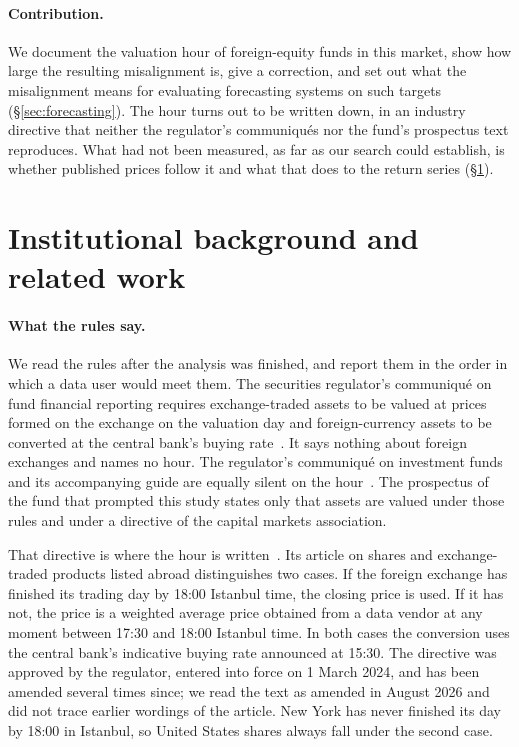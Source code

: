 \documentclass[11pt,a4paper]{article}
\begin{document}
\paragraph{Contribution.} We document the valuation hour of foreign-equity
funds in this market, show how large the resulting misalignment is, give a
correction, and set out what the misalignment means for evaluating
forecasting systems on such targets (\S\ref{sec:forecasting}). The hour turns out to be written down, in an industry directive
that neither the regulator's communiqu\'es nor the fund's prospectus text
reproduces. What had not been measured, as far as our search could establish,
is whether published prices follow it and what that does to the return series
(\S\ref{sec:related}).

\section{Institutional background and related work}\label{sec:related}

\paragraph{What the rules say.} We read the rules after the analysis was
finished, and report them in the order in which a data user would meet them.
The securities regulator's communiqu\'e on fund financial reporting requires
exchange-traded assets to be valued at prices formed on the exchange on the
valuation day and foreign-currency assets to be converted at the central
bank's buying rate~\cite{spk2013valuation}. It says nothing about foreign
exchanges and names no hour. The regulator's communiqu\'e on investment funds
and its accompanying guide are equally silent on the
hour~\cite{spk2013funds}. The prospectus of the fund that prompted this study
states only that assets are valued under those rules and under a directive of
the capital markets association.

That directive is where the hour is written~\cite{tspb2026valuation}. Its
article on shares and exchange-traded products listed abroad distinguishes two
cases. If the foreign exchange has finished its trading day by 18:00 Istanbul
time, the closing price is used. If it has not, the price is a weighted
average price obtained from a data vendor at any moment between 17:30 and
18:00 Istanbul time. In both cases the conversion uses the central bank's
indicative buying rate announced at 15:30. The directive was approved by the
regulator, entered into force on 1 March 2024, and has been amended several
times since; we read the text as amended in August 2026 and did not trace
earlier wordings of the article. New York has never finished its day by
18:00 in Istanbul, so United States shares always fall under the second case.
\end{document}
